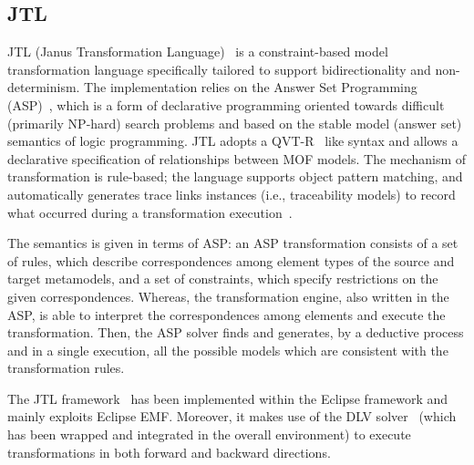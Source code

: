 \subsection{JTL}
\label{sec:JTL}



JTL (Janus Transformation Language)~\cite{CDEP10} is a constraint-based model transformation language specifically tailored to support bidirectionality and non-determinism. The implementation relies on the Answer Set Programming (ASP)~\cite{GL88}, which is a form of declarative programming oriented towards difficult (primarily NP-hard) search problems and based on the stable model (answer set) semantics of logic programming. 
JTL adopts a QVT-R~\cite{QVT-1.3} like syntax and allows a declarative specification of relationships between MOF models. The mechanism of transformation is rule-based; the language supports object pattern matching, and automatically generates trace links instances (i.e., traceability models) to record what occurred during a transformation execution~\cite{EPT18}. %

The semantics is given in terms of ASP: an ASP transformation consists of a set of rules, which describe correspondences among element types of the source and target metamodels, and a set of constraints, which specify restrictions on the given correspondences.  Whereas, the transformation engine, also written in the ASP, is able to interpret the correspondences among elements and execute the transformation. Then, the ASP solver finds and generates, by a deductive process and in a single execution, all the possible models which are consistent with the transformation rules. 
 

The JTL framework~\cite{EPT18}
has been implemented within the Eclipse framework and mainly exploits Eclipse EMF. Moreover, it makes use of the DLV
solver~\cite{DLV} (which has been wrapped and integrated in the overall environment) to execute transformations in both forward and backward directions.


